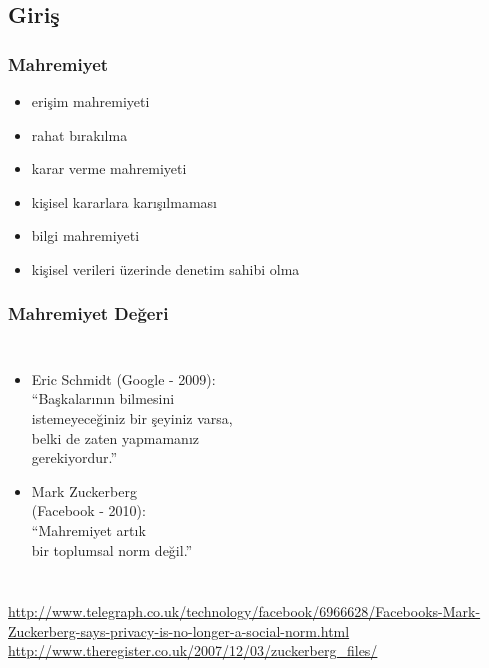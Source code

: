 \documentclass[dvipsnames]{beamer}
\theoremstyle{definition}
\theoremstyle{example}
\theoremstyle{plain}
\begin{document}
\subsection{Giriş}

\begin{frame}
  \frametitle{Mahremiyet}

  \begin{itemize}
    \item erişim mahremiyeti
    \item rahat bırakılma

    \pause
    \bigskip
    \item karar verme mahremiyeti
    \item kişisel kararlara karışılmaması

    \pause
    \bigskip
    \item bilgi mahremiyeti
    \item kişisel verileri üzerinde denetim sahibi olma
  \end{itemize}
\end{frame}

\begin{frame}
  \frametitle{Mahremiyet Değeri}

  \begin{columns}

    \begin{itemize}
      \item Eric Schmidt (Google - 2009):\\
        \smallskip
        ``Başkalarının bilmesini\\
          istemeyeceğiniz bir şeyiniz varsa,\\
          belki de zaten yapmamanız\\
          gerekiyordur.''

      \pause
      \medskip
      \item Mark Zuckerberg\\
        (Facebook - 2010):\\
        \smallskip
        ``Mahremiyet artık\\
          bir toplumsal norm değil.''
    \end{itemize}
  \end{columns}

  \medskip
  \tiny{\url{http://www.telegraph.co.uk/technology/facebook/6966628/Facebooks-Mark-Zuckerberg-says-privacy-is-no-longer-a-social-norm.html}}\\
  \tiny{\url{http://www.theregister.co.uk/2007/12/03/zuckerberg_files/}}\\
\end{frame}
\end{document}
